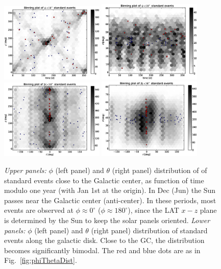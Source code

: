 \documentclass[aps,twocolumn,prd,superscriptaddress,showpacs,nofootinbib,fixfloat]{revtex4}
\begin{document}
\begin{figure}
  \centering
  \includegraphics[width=0.44\textwidth]{plots/TIME_PHI.eps}
  \includegraphics[width=0.44\textwidth]{plots/TIME_THETA.eps}
  \includegraphics[width=0.44\textwidth]{plots/L_PHI.eps}
  \includegraphics[width=0.44\textwidth]{plots/L_THETA.eps}
  \caption{\emph{Upper panels:} $\phi$ (left panel) and $\theta$ (right panel)
  distribution of of standard events close to the Galactic center, as function
  of time modulo one year (with Jan 1st at the origin). In Dec (Jun) the Sun
  passes near the Galactic center (anti-center).  In these periods, most
  events are observed at $\phi\approx 0^\circ$ ($\phi\approx 180^\circ$),
  since the LAT $x-z$ plane is determined by the Sun to keep the solar panels
  oriented. \emph{Lower panels:} $\phi$ (left panel) and $\theta$ (right panel)
  distribution of standard events along the galactic disk. Close to the GC,
  the distribution becomes significantly bimodal. The red and blue dots are as
  in Fig.~\ref{fig:phiThetaDist}.}
  \label{fig:time_phi}
\end{figure}
\end{document}
